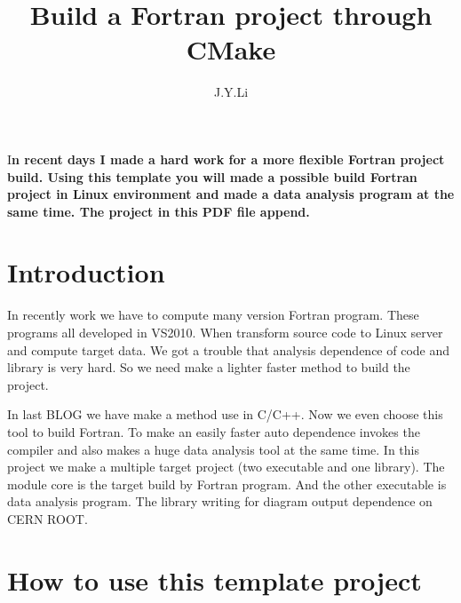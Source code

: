 \documentclass[DIV=calc, paper=a4, fontsize=11pt, twocolumn]{scrartcl}	 %
\title{Build a Fortran project through CMake} %
\author{J.Y.Li} %
\date{} %
\newcommand{\initial}[1]{ %
\lettrine[lines=3,lhang=0.3,nindent=0em]{
\color{DarkGoldenrod}
{\textsf{#1}}}{}}
\begin{document}
\maketitle %

\thispagestyle{fancy} %


\initial{I}\textbf{n recent days I made a hard work for a more flexible Fortran project build. Using this template you will made a possible build Fortran project in Linux environment and made a data analysis program at the same time. The project in this PDF file append.  }


\section*{Introduction}

In recently work we have to compute many version Fortran program.
These programs all developed in VS2010. 
When transform source code to Linux server and compute target data.
We got a trouble that analysis dependence of code and library is very hard.
So we need make a lighter faster method to build the project.

In last BLOG we have make a method use in C/C++. 
Now we even choose this tool to build Fortran.
To make an easily faster auto dependence invokes the compiler and also makes a huge data analysis tool at the same time.
In this project we make a multiple target project (two executable and one library). 
The module core is the target build by Fortran program.
And the other executable is data analysis program. 
The library writing for diagram output dependence on CERN ROOT.

\section{How to use this template project}
\end{document}
